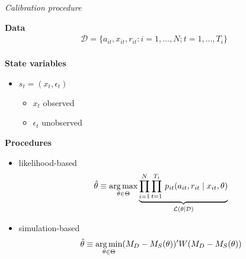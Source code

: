 \begin{frame}\begin{center}
		\LARGE\textit{Calibration procedure}
\end{center}\end{frame}
\begin{frame}

\textbf{Data}\vspace{0.3cm}
\begin{align*}
	\mathcal{D} = \{a_{it}, x_{it}, r_{it}: i = 1, \hdots, N; t = 1, \hdots, T_i\}\\
\end{align*}

\textbf{State variables}\vspace{0.3cm}
\begin{itemize}\setlength\itemsep{1em}
\item $s_t = (x_t, \epsilon_t)$\medskip
\begin{itemize}\setlength\itemsep{1em}
	\item $x_t$ observed
	\item $\epsilon_t$ unobserved
\end{itemize}
\end{itemize}
\end{frame}
\begin{frame}
\textbf{Procedures}\vspace{0.5cm}
\begin{itemize}\setlength\itemsep{1em}
\item likelihood-based
\begin{align*}
  \hat{\theta} \equiv \operatorname*{arg\,max}_{\theta \in \Theta}  \underbrace{\prod^N_{i= 1} \prod^{T_i}_{t= 1}\, p_{it}(a_{it}, r_{it} \mid x_{it}, \theta)}_{\mathcal{L}(\theta\mid\mathcal{D})}
\end{align*}
\item simulation-based
\begin{align*}
    \hat{\theta} \equiv \operatorname*{arg\,min}_{\theta \in \Theta} (M_D - M_S(\theta))' W (M_D - M_S(\theta))
\end{align*}
\end{itemize}
\end{frame}

